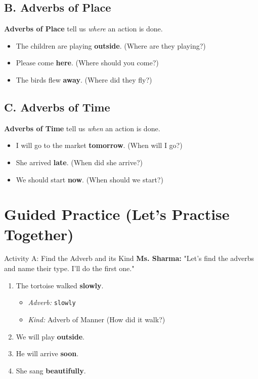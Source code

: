 \subsection*{B. Adverbs of Place}
\textbf{Adverbs of Place} tell us \textit{where} an action is done.
\begin{itemize}
    \item The children are playing \textbf{outside}. (Where are they playing?)
    \item Please come \textbf{here}. (Where should you come?)
    \item The birds flew \textbf{away}. (Where did they fly?)
\end{itemize}

\subsection*{C. Adverbs of Time}
\textbf{Adverbs of Time} tell us \textit{when} an action is done.
\begin{itemize}
    \item I will go to the market \textbf{tomorrow}. (When will I go?)
    \item She arrived \textbf{late}. (When did she arrive?)
    \item We should start \textbf{now}. (When should we start?)
\end{itemize}

\section{Guided Practice (Let's Practise Together)}
\begin{activitybox}{Activity A: Find the Adverb and its Kind}
\textbf{Ms. Sharma:} "Let's find the adverbs and name their type. I'll do the first one."
\begin{enumerate}
    \item The tortoise walked \textbf{slowly}.
    \begin{itemize}
        \item \textit{Adverb:} \texttt{slowly}
        \item \textit{Kind:} Adverb of Manner (How did it walk?)
    \end{itemize}
    \item We will play \textbf{outside}.
    \item He will arrive \textbf{soon}.
    \item She sang \textbf{beautifully}.
\end{enumerate}
\end{activitybox}

